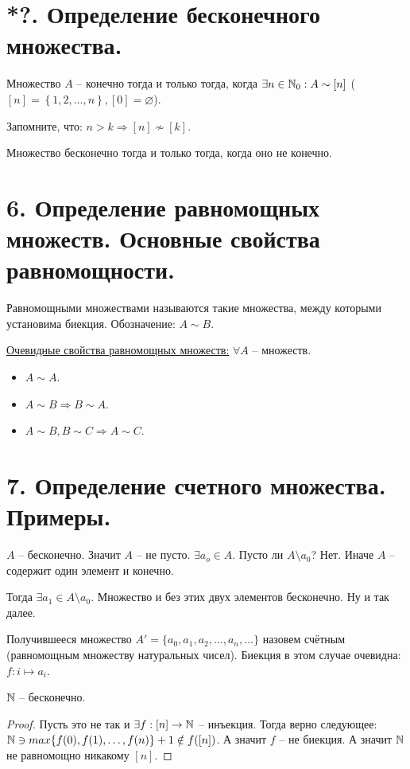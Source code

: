 \section*{*?. Определение бесконечного множества.}

 Множество $A$ -- конечно тогда и только тогда,
когда $\exists n \in \mathbb{N}_0: A \sim [n]$ ($[n] = \left\{ 1, 2, \ldots, n \right\}, [0] = \varnothing$).

Запомните, что: $n > k \Rightarrow [n] \nsim [k]$.

 Множество бесконечно тогда и только тогда, когда оно не конечно.


\section*{6. Определение равномощных множеств. Основные свойства равномощности.}

 Равномощными множествами называются такие множества,
между которыми установима биекция. Обозначение: $A \sim B$.

\underline{Очевидные свойства равномощных множеств:} $\forall A$ -- множеств.
\begin{itemize}
	\item $A \sim A$.
	\item $A \sim B \Rightarrow B \sim A$.
	\item $A \sim B, B \sim C \Rightarrow A \sim C$.
\end{itemize}

\section*{7. Определение счетного множества. Примеры.}

$A$ -- бесконечно. Значит $A$ -- не пусто. $\exists a_o \in A$. 
Пусто ли $A\setminus {a_0}$? Нет. Иначе $A$ -- содержит один элемент и конечно.

Тогда $\exists a_1 \in A\setminus {a_0}$. Множество и без этих двух элементов 
бесконечно. Ну и так далее.

 Получившееся множество $A' = \{a_0, a_1, a_2, \ldots, a_n, \ldots\}$ 
назовем счётным (равномощным множеству натуральных чисел).
Биекция в этом случае очевидна: $f: i \mapsto a_i$.

\statement $\mathbb{N}$ -- бесконечно.
\begin{proof}
	Пусть это не так и $\exists f: [n] \to \mathbb{N}$ -- инъекция. Тогда верно следующее:
	$\mathbb{N} \ni max\{f(0), f(1), \ldots, f(n)\}+1 \notin f([n])$. А значит $f$ -- не биекция.
	А значит $\mathbb{N}$ не равномощно никакому $[n]$.
\end{proof}

